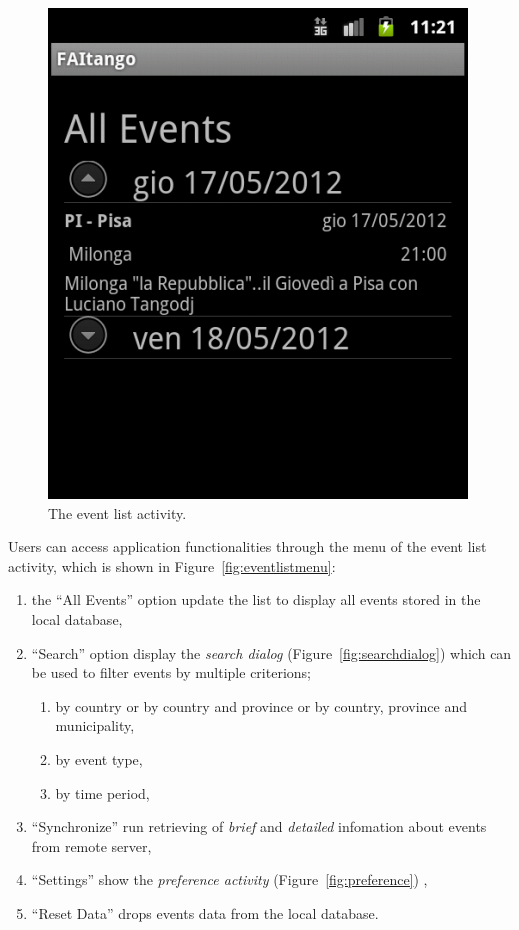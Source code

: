 \documentclass[12pt, twoside]{article}
\begin{document}
\begin{figure}[h]
\begin{center}
\includegraphics[scale=0.50]{fig/allevents-brief.png}
\end{center}
\caption{The event list activity.}
\label{fig:eventlist}
\end{figure}

Users can access application functionalities through the menu of the event list activity, which is shown in Figure~\ref{fig:eventlistmenu}:
\begin{enumerate}
	\item	the ``All Events'' option update the list to display all events stored in the local database,
	\item	``Search'' option display the \emph{search dialog} (Figure~\ref{fig:searchdialog}) 
		which can be used to filter events by multiple criterions;
		\begin{enumerate}
			\item by country or by country and province or by country, province and municipality,
			\item by event type,
			\item by time period,
		\end{enumerate}
	\item	``Synchronize'' run retrieving of \emph{brief} and \emph{detailed} infomation about events from remote server,
	\item	``Settings'' show the \emph{preference activity}  (Figure~\ref{fig:preference}) ,
	\item	``Reset Data'' drops events data from the local database.
\end{enumerate}
\end{document}
